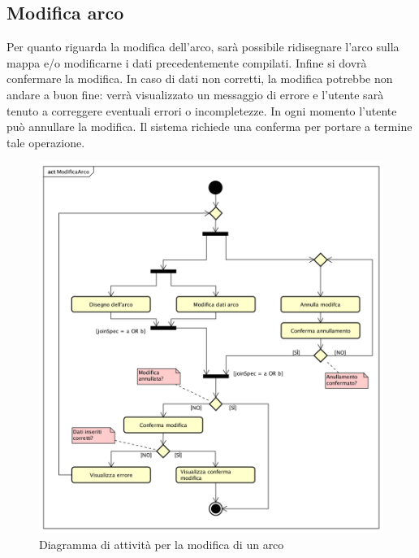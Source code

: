\newpage
\subsection{Modifica arco}
Per quanto riguarda la modifica dell'arco, sarà possibile ridisegnare l'arco sulla mappa e/o modificarne i dati precedentemente compilati. Infine si dovrà confermare la modifica. In caso di dati non corretti, la modifica potrebbe non andare a buon fine: verrà visualizzato un messaggio di errore e l'utente sarà tenuto a correggere eventuali errori o incompletezze.
In ogni momento l'utente può annullare la modifica. Il sistema richiede una conferma per portare a termine tale operazione.
\begin{figure}[H]
	\centering
	\includegraphics[width=\textwidth]{img/DiagrammiDiAttivita/ModificaArco.png}
	\caption{Diagramma di attività per la modifica di un arco}
\end{figure}

\newpage
